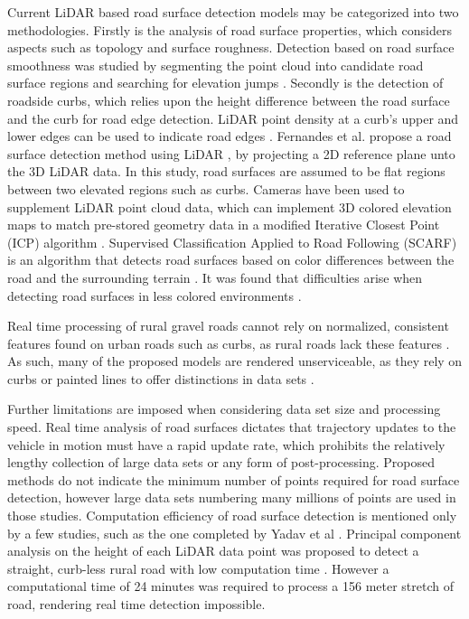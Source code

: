 \documentclass[journal,onecolumn]{IEEEtran}
\begin{document}
{	Current LiDAR based road surface detection models may be categorized into two methodologies. Firstly is the analysis of road surface properties, which considers aspects such as topology and surface roughness. Detection based on road surface smoothness was studied by segmenting the point cloud into candidate road surface regions and searching for elevation jumps \cite{liu_new_2013}. Secondly is the detection of roadside curbs, which relies upon the height difference between the road surface and the curb for road edge detection. LiDAR point density at a curb's upper and lower edges can be used to indicate road edges \cite{ibrahim_curb-based_2012}. Fernandes et al. propose a road surface detection method using LiDAR \cite{fernandes_road_2014}, by projecting a 2D reference plane unto the 3D LiDAR data. In this study, road surfaces are assumed to be flat regions between two elevated regions such as curbs. Cameras have been used to supplement LiDAR point cloud data, which can implement 3D colored elevation maps to match pre-stored geometry data in a modified Iterative Closest Point (ICP) algorithm \cite{manz_detection_2011}. Supervised Classification Applied to Road Following (SCARF) is an algorithm that detects road surfaces based on color differences between the road and the surrounding terrain \cite{crisman_scarf_1993}. It was found that difficulties arise when detecting road surfaces in less colored environments \cite{crisman_scarf_1993,manz_detection_2011}.
	
	Real time processing of rural gravel roads cannot rely on normalized, consistent features found on urban roads such as curbs, as rural roads lack these features \cite{skorseth_gravel_nodate}. As such, many of the proposed models are rendered unserviceable, as they rely on curbs or painted lines to offer distinctions in data sets \cite{yadav_extraction_2017,liu_new_2013,qiu_fast_2016,fernandes_road_2014,seker_experiments_nodate,yang_semi-automated_2013,miyazaki_line-based_2014,hervieu_road_2013,smadja_road_nodate}.
	
	Further limitations are imposed when considering data set size and processing speed. Real time analysis of road surfaces dictates that trajectory updates to the vehicle in motion must have a rapid update rate, which prohibits the relatively lengthy collection of large data sets or any form of post-processing. Proposed methods \cite{yadav_extraction_2017,yadav_road_2018,yadav_rural_2018,yadav_pole-shaped_2015,miyazaki_line-based_2014,yang_semi-automated_2013,liu_new_2013,qiu_fast_2016} do not indicate the minimum number of points required for road surface detection, however large data sets numbering many millions of points are used in those studies. Computation efficiency of road surface detection is mentioned only by a few studies, such as the one completed by Yadav et al \cite{yadav_road_2018}. Principal component analysis on the height of each LiDAR data point was proposed to detect a straight, curb-less rural road with low computation time \cite{yadav_road_2018}. However a computational time of 24 minutes was required to process a 156 meter stretch of road, rendering real time detection impossible.
	
}
\end{document}
